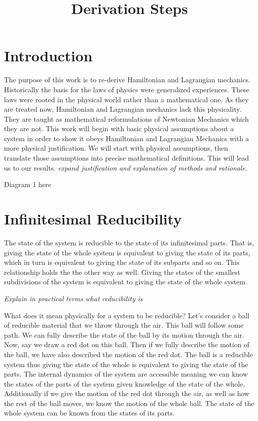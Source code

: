 \documentclass{article}
\begin{document}
\title{Derivation Steps}

\section{Introduction}

	The purpose of this work is to re-derive Hamiltonian and Lagrangian mechanics. Historically the basis for the laws of physics were generalized experiences. These laws were rooted in the physical world rather than a mathematical one. As they are treated now, Hamiltonian and Lagrangian mechanics lack this physicality. They are taught as mathematical reformulations of Newtonian Mechanics which they are not. This work will begin with basic physical assumptions about a system in order to show it obeys Hamiltonian and Lagrangian Mechanics with a more physical justification. We will start with physical assumptions, then translate those assumptions into precise mathematical definitions. This will lead us to our results. \emph{expand justification and explanation of methods and rationale.}
	
Diagram 1 here

\section{Infinitesimal Reducibility}
	
\begin{assump}
	The state of the system is reducible to the state of its infinitesimal parts. That is, giving the state of the whole system is equivalent to giving the state of its parts, which in turn is equivalent to giving the state of its subparts and so on. This relationship holds the the other way as well. Giving the states of the smallest subdivisions of the system is equivalent to giving the state of the whole system.
\end{assump}
	
	\emph{Explain in practical terms what reducibility is}
	
	What does it mean physically for a system to be reducible? Let's consider a ball of reducible material that we throw through the air. This ball will follow some path. We can fully describe the state of the ball by its motion through the air. Now, say we draw a red dot on this ball. Then if we fully describe the motion of the ball, we have also described the motion of the red dot. The ball is a reducible system thus giving the state of the whole is equivalent to giving the state of the parts. The internal dynamics of the system are accessible meaning we can know the states of the parts of the system given knowledge of the state of the whole. Additionally if we give the motion of the red dot through the air, as well as how the rest of the ball moves, we know the motion of the whole ball. The state of the whole system can be known from the states of its parts. 
	
\end{document}
